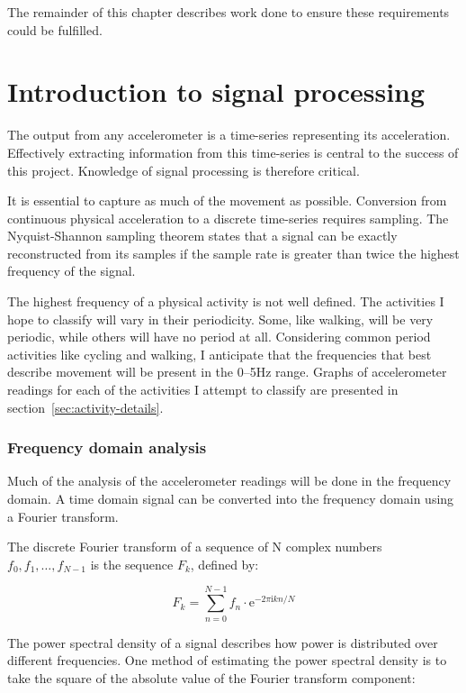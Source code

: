     The remainder of this chapter describes work done to ensure these requirements could be fulfilled.
  
  \section{Introduction to signal processing}
    \label{sec:intro-sig-processing}
    The output from any accelerometer is a time-series representing its acceleration. Effectively extracting information from this time-series is central to the success of this project. Knowledge of signal processing is therefore critical.
    
    It is essential to capture as much of the movement as possible. Conversion from continuous 
    physical acceleration to a discrete time-series requires sampling. The Nyquist-Shannon sampling theorem states that a signal can be exactly reconstructed from its samples if the sample rate is greater than twice the highest frequency of the signal.
    
    The highest frequency of a physical activity is not well defined. The activities I hope to classify will vary in their periodicity. Some, like walking, will be very periodic, while others will have no period at all. Considering common period activities like cycling and walking, I anticipate that the frequencies that best describe movement will be present in the 0--5\si{Hz} range. Graphs of accelerometer readings for each of the activities I attempt to classify are presented in section~\ref{sec:activity-details}. 
    
    \subsubsection{Frequency domain analysis}
      Much of the analysis of the accelerometer readings will be done in the frequency domain. A time domain signal can be converted into the frequency domain using a Fourier transform.
      
      The discrete Fourier transform of a sequence of N complex numbers $f_0, f_1, \ldots, f_{N-1}$ is the sequence $F_k$, defined by:
      
      $$F_k = \sum\limits_{n=0}^{N-1} f_n \cdot \mathrm{e}^{-2\pi \mathrm{i} kn/N}$$
      
      The power spectral density of a signal describes how power is distributed over different frequencies. One method of estimating the power spectral density is to take the square of the absolute value of the Fourier transform component:
      
